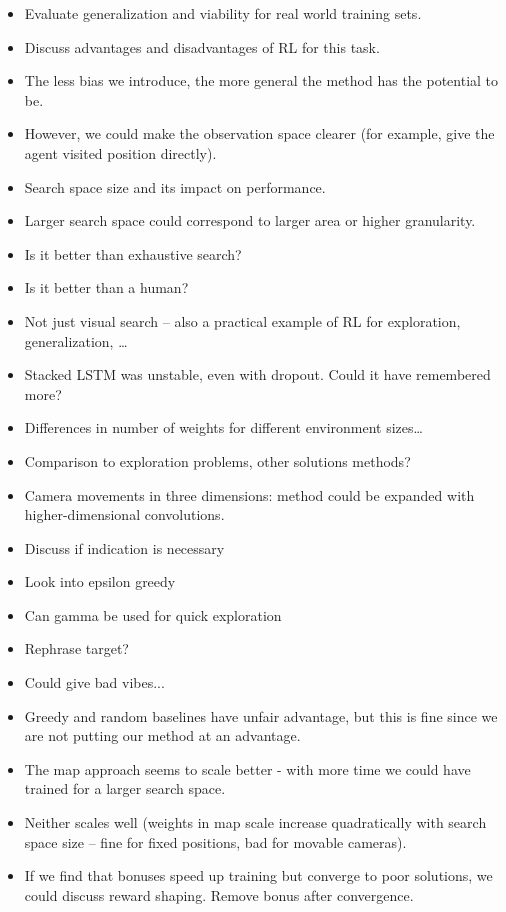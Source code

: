 \begin{itemize}
    \item Evaluate generalization and viability for real world training sets. 
    \item Discuss advantages and disadvantages of RL for this task.
    \item The less bias we introduce, the more general the method has the potential to be.
    \item However, we could make the observation space clearer (for example, give the agent visited position directly).
    \item Search space size and its impact on performance.
    \item Larger search space could correspond to larger area or higher granularity.
    \item Is it better than exhaustive search?
    \item Is it better than a human?
    \item Not just visual search -- also a practical example of RL for exploration, generalization, \dots
    \item Stacked LSTM was unstable, even with dropout. Could it have remembered more?
    \item Differences in number of weights for different environment sizes\dots
    \item Comparison to exploration problems, other solutions methods?
    \item Camera movements in three dimensions: method could be expanded with higher-dimensional convolutions. 
    \item Discuss if indication is necessary
    \item Look into epsilon greedy
    \item Can gamma be used for quick exploration
    \item Rephrase target?
    \item Could give bad vibes...
    \item Greedy and random baselines have unfair advantage, but this is fine since we are not putting our method at an advantage.
    \item The map approach seems to scale better - with more time we could have trained for a larger search space.
    \item Neither scales well (weights in map scale increase quadratically with search space size -- fine for fixed positions, bad for movable cameras).
    \item If we find that bonuses speed up training but converge to poor solutions, we could discuss reward shaping. Remove bonus after convergence.

\end{itemize}
